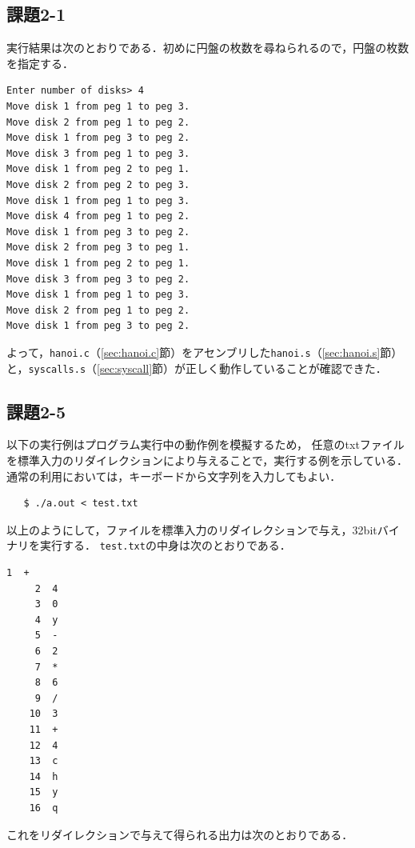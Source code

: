 \subsection{課題2-1}
実行結果は次のとおりである．初めに円盤の枚数を尋ねられるので，円盤の枚数を指定する．

\begin{Verbatim}
Enter number of disks> 4
Move disk 1 from peg 1 to peg 3.
Move disk 2 from peg 1 to peg 2.
Move disk 1 from peg 3 to peg 2.
Move disk 3 from peg 1 to peg 3.
Move disk 1 from peg 2 to peg 1.
Move disk 2 from peg 2 to peg 3.
Move disk 1 from peg 1 to peg 3.
Move disk 4 from peg 1 to peg 2.
Move disk 1 from peg 3 to peg 2.
Move disk 2 from peg 3 to peg 1.
Move disk 1 from peg 2 to peg 1.
Move disk 3 from peg 3 to peg 2.
Move disk 1 from peg 1 to peg 3.
Move disk 2 from peg 1 to peg 2.
Move disk 1 from peg 3 to peg 2.
\end{Verbatim}

よって，\verb|hanoi.c|（\ref{sec:hanoi.c}節）をアセンブリした\verb|hanoi.s|（\ref{sec:hanoi.s}節）と，\verb|syscalls.s|（\ref{sec:syscall}節）が正しく動作していることが確認できた．

\subsection{課題2-5}
以下の実行例はプログラム実行中の動作例を模擬するため，
任意のtxtファイルを標準入力のリダイレクションにより与えることで，実行する例を示している．
通常の利用においては，キーボードから文字列を入力してもよい．

{\fontsize{10pt}{11pt} \selectfont
 \begin{verbatim}
   $ ./a.out < test.txt
 \end{verbatim}
}

以上のようにして，ファイルを標準入力のリダイレクションで与え，32bitバイナリを実行する．
\verb|test.txt|の中身は次のとおりである．
\begin{Verbatim}[fontsize=\small, baselinestretch=0.8]
     1	+
     2	4
     3	0
     4	y
     5	-
     6	2
     7	*
     8	6
     9	/
    10	3
    11	+
    12	4
    13	c
    14	h
    15	y
    16	q
\end{Verbatim}

これをリダイレクションで与えて得られる出力は次のとおりである．

